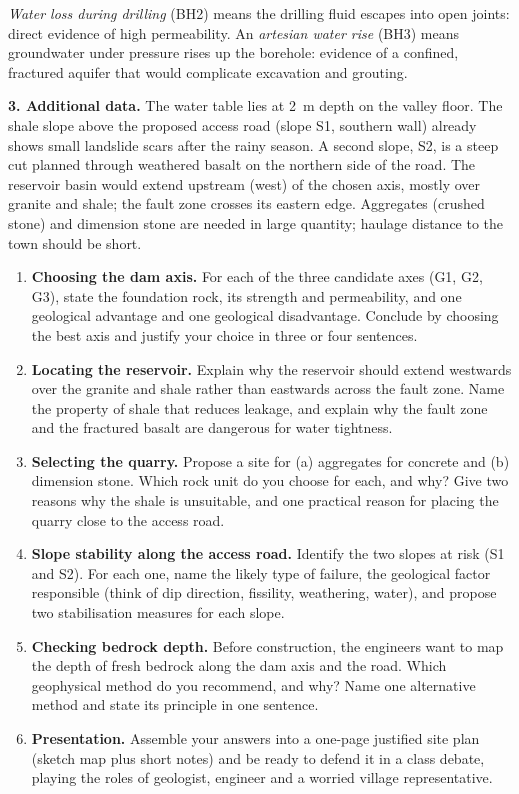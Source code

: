 \documentclass[11pt]{article}
\newcommand{\cle}[1]{{\popxbold\color{popdark}#1}}
\newcounter{popsec}
\newcounter{popsub}
\newcommand{\courssub}[1]{%
  \stepcounter{popsub}%
  \par\vspace{9pt}\noindent{\popxbold\fontsize{11.5}{13}\selectfont\color{popink}{\color{poporange}\thepopsec.\thepopsub}\hspace{6pt}#1}\par\nopagebreak\vspace{4pt}
}
\begin{document}
\begin{attention}
\emph{Water loss during drilling} (BH2) means the drilling fluid escapes into open joints: direct evidence of high \cle{permeability}. An \emph{artesian water rise} (BH3) means groundwater under pressure rises up the borehole: evidence of a confined, fractured aquifer that would complicate excavation and grouting.
\end{attention}

\textbf{3. Additional data.} The water table lies at \SI{2}{m} depth on the valley floor. The shale slope above the proposed access road (slope S1, southern wall) already shows small landslide scars after the rainy season. A second slope, S2, is a steep cut planned through weathered basalt on the northern side of the road. The reservoir basin would extend upstream (west) of the chosen axis, mostly over granite and shale; the fault zone crosses its eastern edge. Aggregates (crushed stone) and dimension stone are needed in large quantity; haulage distance to the town should be short.

\courssub{Tasks}

\begin{enumerate}
\item \textbf{Choosing the dam axis.} For each of the three candidate axes (G1, G2, G3), state the foundation rock, its strength and permeability, and one geological advantage and one geological disadvantage. Conclude by choosing the best axis and justify your choice in three or four sentences.
\item \textbf{Locating the reservoir.} Explain why the reservoir should extend westwards over the granite and shale rather than eastwards across the fault zone. Name the property of shale that reduces leakage, and explain why the fault zone and the fractured basalt are dangerous for water tightness.
\item \textbf{Selecting the quarry.} Propose a site for (a) aggregates for concrete and (b) dimension stone. Which rock unit do you choose for each, and why? Give two reasons why the shale is unsuitable, and one practical reason for placing the quarry close to the access road.
\item \textbf{Slope stability along the access road.} Identify the two slopes at risk (S1 and S2). For each one, name the likely type of failure, the geological factor responsible (think of dip direction, fissility, weathering, water), and propose two stabilisation measures for each slope.
\item \textbf{Checking bedrock depth.} Before construction, the engineers want to map the depth of fresh bedrock along the dam axis and the road. Which geophysical method do you recommend, and why? Name one alternative method and state its principle in one sentence.
\item \textbf{Presentation.} Assemble your answers into a one-page justified site plan (sketch map plus short notes) and be ready to defend it in a class debate, playing the roles of geologist, engineer and a worried village representative.
\end{enumerate}
\end{document}

